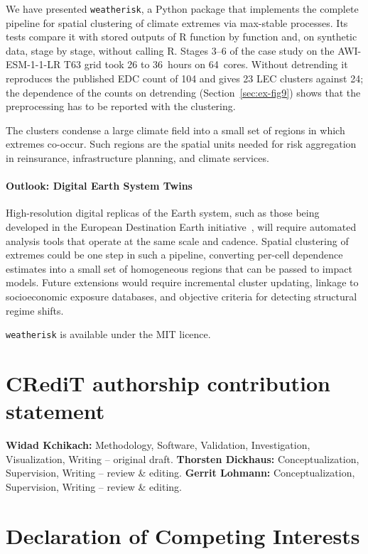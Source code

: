 \documentclass[preprint,12pt,a4paper]{elsarticle}
\begin{document}
We have presented \texttt{weatherisk}, a Python package that
implements the complete pipeline for spatial clustering of climate
extremes via max-stable processes. Its tests compare it with
stored outputs of R function by function and, on synthetic data,
stage by stage, without calling R. Stages 3--6 of the
case study on the AWI-ESM-1-1-LR T63 grid took 26 to 36~hours
on 64~cores. Without detrending it reproduces the published EDC count
of 104 and gives 23 LEC clusters against 24; the dependence of the
counts on detrending (Section~\ref{sec:ex-fig9}) shows that the
preprocessing has to be reported with the clustering.

The clusters condense a large climate field into a small set of
regions in which extremes co-occur. Such regions are the spatial units
needed for risk aggregation in reinsurance, infrastructure planning,
and climate services.

\paragraph{Outlook: Digital Earth System Twins}
High-resolution digital replicas of the Earth system, such as those
being developed in the European Destination Earth
initiative~\cite{bauer2021}, will require automated analysis tools
that operate at the same scale and cadence.
Spatial clustering of extremes could be one step in such a pipeline,
converting per-cell dependence estimates into a small set of
homogeneous regions that can be passed to impact models.
Future extensions would require incremental cluster updating, linkage
to socioeconomic exposure databases, and objective criteria for
detecting structural regime shifts.

\texttt{weatherisk} is available under the MIT licence.

\section*{CRediT authorship contribution statement}
\textbf{Widad Kchikach:} Methodology, Software, Validation,
Investigation, Visualization, Writing -- original draft.
\textbf{Thorsten Dickhaus:} Conceptualization, Supervision,
Writing -- review \& editing.
\textbf{Gerrit Lohmann:} Conceptualization, Supervision,
Writing -- review \& editing.

\section*{Declaration of Competing Interests}
\end{document}
